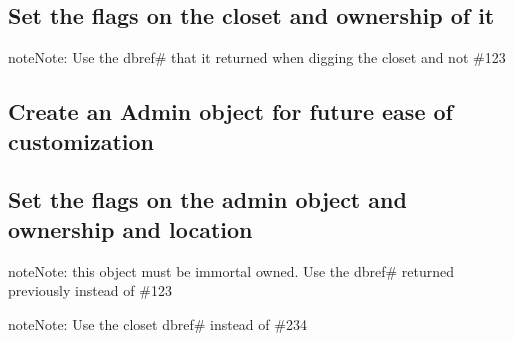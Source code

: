 \documentclass[letterpaper,10pt,english]{sphinxmanual}
\begin{document}
\begin{sphinxVerbatim}[commandchars=\\\{\}]
 
\end{sphinxVerbatim}


\subsection{Set the flags on the closet and ownership of it}
\label{\detokenize{gettingstarted:set-the-flags-on-the-closet-and-ownership-of-it}}
\begin{sphinxadmonition}{note}{Note:}
\sphinxAtStartPar
Use the dbref\# that it returned when digging the closet and not \#123
\end{sphinxadmonition}

\begin{sphinxVerbatim}[commandchars=\\\{\}]
 
 
\end{sphinxVerbatim}


\subsection{Create an Admin object for future ease of customization}
\label{\detokenize{gettingstarted:create-an-admin-object-for-future-ease-of-customization}}
\begin{sphinxVerbatim}[commandchars=\\\{\}]
 
\end{sphinxVerbatim}


\subsection{Set the flags on the admin object and ownership and location}
\label{\detokenize{gettingstarted:set-the-flags-on-the-admin-object-and-ownership-and-location}}
\begin{sphinxadmonition}{note}{Note:}
\sphinxAtStartPar
this object must be immortal owned.  Use the dbref\# returned previously instead of \#123
\end{sphinxadmonition}

\begin{sphinxadmonition}{note}{Note:}
\sphinxAtStartPar
Use the closet dbref\# instead of \#234
\end{sphinxadmonition}
\end{document}
